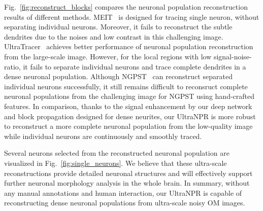 Fig.~\ref{fig:reconstruct_blocks} compares the neuronal population reconstruction results of different methods.
%
MEIT~\cite{Wang2018} is designed for tracing single neuron, without separating individual neurons. 
Moreover, it fails to reconstruct the subtle dendrites due to the noises and low contrast in this challenging image.
UltraTracer~\cite{Peng2017} achieves better performance of neuronal population reconstruction from the large-scale image. 
However, for the local regions with low signal-noise-ratio, it fails to separate individual neurons and trace complete dendrites in a dense neuronal population.
Although NGPST~\cite{Quan2015} can reconstruct separated individual neurons successfully, it still remains difficult to reconsruct complete neuronal populations from the challenging image for NGPST using hand-crafted features.
In comparison, thanks to the signal enhancement by our deep network and block propagation designed for dense neurites, our UltraNPR is more robust to reconstruct a more complete neuronal population from the low-quality image while individual neurons are continuously and smoothly traced.



Several neurons selected from the reconstructed neuronal population are visualized in Fig.~\ref{fig:single_neurons}. 
We believe that these ultra-scale reconstructions provide detailed neuronal structures and will effectively support further neuronal morphology analysis in the whole brain. 
In summary, without any manual annotations and human interaction, our UltraNPR is capable of reconstructing dense neuronal populations from ultra-scale noisy OM images. 
